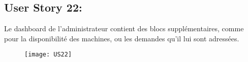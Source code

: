\newpage
\subsection{User Story 22:}
Le dashboard de l'administrateur contient des blocs supplémentaires, comme pour la disponibilité des machines,
ou les demandes qu'il lui sont adressées.


\begin{figure}[!h]
  \begin{center}
        \texttt{[image: US22]}
        \label{US22-dia}
  \end{center}
\end{figure}